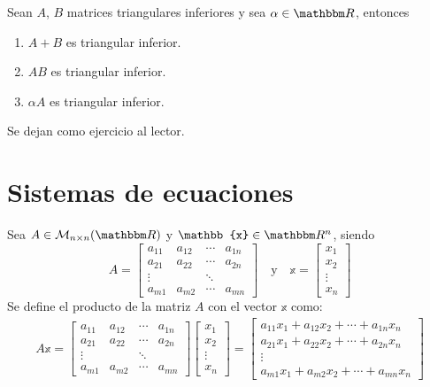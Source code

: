 \newpage

\begin{proposition}
    Sean $A$, $B$ matrices triangulares inferiores y sea $\alpha \in \RR$, entonces
    \begin{enumerate}[label=\roman*.]
        \item $A+B$ es triangular inferior.
        \item $AB$ es triangular inferior.
        \item $\alpha A$ es triangular inferior.
    \end{enumerate}
    \demostracion Se dejan como ejercicio al lector.
\end{proposition}

\section{Sistemas de ecuaciones}

\begin{definition}\label{definicion:JSJJNDJUDUDJNDN}
    Sea $A \in \mathcal{M}_{n \times n}(\RR)$ y $\mathbb{x} \in \RR[n]$, siendo
    $$A = \begin{bmatrix}
        a_{11} & a_{12} & \cdots & a_{1n}\\
        a_{21} & a_{22} & \cdots & a_{2n}\\
        \vdots &  & \ddots & \\
        a_{m1} & a_{m2} & \cdots & a_{mn}
    \end{bmatrix} \quad \text{y} \quad \mathbb{x} = \begin{bmatrix}
        x_1 \\
        x_2 \\
        \vdots \\
        x_n
    \end{bmatrix}$$
    Se define el producto de la matriz $A$ con el vector $\mathbb{x}$ como:
    \begin{align*}
        A \mathbb{x} = \begin{bmatrix}
            a_{11} & a_{12} & \cdots & a_{1n}\\
            a_{21} & a_{22} & \cdots & a_{2n}\\
            \vdots &  & \ddots & \\
            a_{m1} & a_{m2} & \cdots & a_{mn}
        \end{bmatrix} \begin{bmatrix}
            x_1 \\
            x_2 \\
            \vdots \\
            x_n
        \end{bmatrix} = \begin{bmatrix}
            a_{11}x_1 + a_{12}x_2 + \cdots + a_{1n}x_n \\
            a_{21}x_1 + a_{22}x_2 + \cdots + a_{2n}x_n \\
            \vdots \\
            a_{m1}x_1 + a_{m2}x_2 + \cdots + a_{mn}x_n
        \end{bmatrix}
    \end{align*}
\end{definition}

